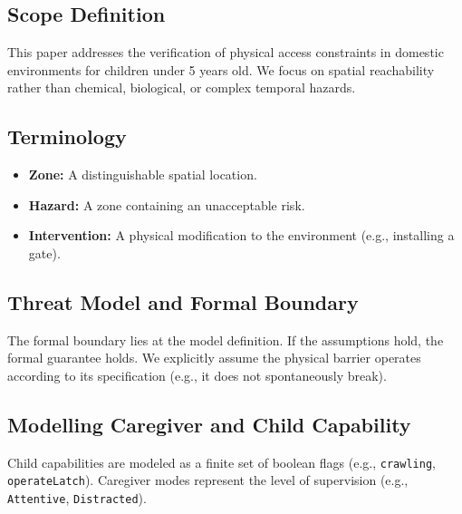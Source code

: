 \subsection{Scope Definition}
This paper addresses the verification of physical access constraints in domestic environments for children under 5 years old. We focus on spatial reachability rather than chemical, biological, or complex temporal hazards.

\subsection{Terminology}
\begin{itemize}
    \item \textbf{Zone:} A distinguishable spatial location.
    \item \textbf{Hazard:} A zone containing an unacceptable risk.
    \item \textbf{Intervention:} A physical modification to the environment (e.g., installing a gate).
\end{itemize}

\subsection{Threat Model and Formal Boundary}
The formal boundary lies at the model definition. If the assumptions hold, the formal guarantee holds. We explicitly assume the physical barrier operates according to its specification (e.g., it does not spontaneously break).

\subsection{Modelling Caregiver and Child Capability}
Child capabilities are modeled as a finite set of boolean flags (e.g., \texttt{crawling}, \texttt{operateLatch}). Caregiver modes represent the level of supervision (e.g., \texttt{Attentive}, \texttt{Distracted}).
